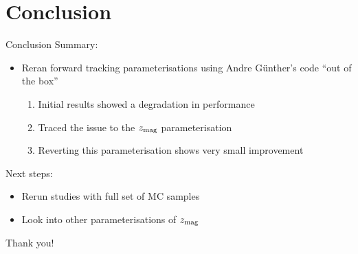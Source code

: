 \documentclass[xcolor={dvipsnames}]{beamer}
\begin{document}
\section{Conclusion}

\begin{frame}{Conclusion}
  \vspace{0.0cm}
  {\Large Summary:}
  \begin{itemize}
    \item{Reran forward tracking parameterisations using Andre G{\"u}nther's code ``out of the box''}
    \begin{enumerate}
      \item{Initial results showed a degradation in performance}
      \item{Traced the issue to the $z_{\rm mag}$ parameterisation}
      \item{Reverting this parameterisation shows very small improvement}
    \end{enumerate}
  \end{itemize}
  \vspace{0.6cm}
  {\Large Next steps:}
  \begin{itemize}
    \item{Rerun studies with full set of MC samples}
    \item{Look into other parameterisations of $z_{\rm mag}$}
  \end{itemize}
  \vspace{0.3cm}
  \begin{center}
    \Huge Thank you!
  \end{center}
\end{frame}
\end{document}
